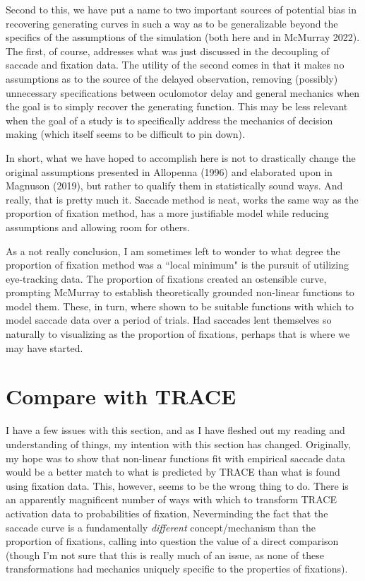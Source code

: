 \documentclass{article}
\begin{document}
Second to this, we have put a name to two important sources of potential bias in recovering generating curves in such a way as to be generalizable beyond the specifics of the assumptions of the simulation (both here and in McMurray 2022). The first, of course, addresses what was just discussed in the decoupling of saccade and fixation data. The utility of the second comes in that it makes no assumptions as to the source of the delayed observation, removing (possibly) unnecessary specifications between oculomotor delay and general mechanics when the goal is to simply recover the generating function. This may be less relevant when the goal of a study is to specifically address the mechanics of decision making (which itself seems to be difficult to pin down).

In short, what we have hoped to accomplish here is not to drastically change the original assumptions presented in Allopenna (1996) and elaborated upon in Magnuson (2019), but rather to qualify them in statistically sound ways. And really, that is pretty much it. Saccade method is neat, works the same way as the proportion of fixation method, has a more justifiable model while reducing assumptions and allowing room for others.

As a not really conclusion, I am sometimes left to wonder to what degree the proportion of fixation method was a  ``local minimum" is the pursuit of utilizing eye-tracking data. The proportion of fixations created an ostensible curve, prompting McMurray to establish theoretically grounded non-linear functions to model them. These, in turn, where shown to be suitable functions with which to model saccade data over a period of trials. Had saccades lent themselves so naturally to visualizing as the proportion of fixations, perhaps that is where we may have started.



\section{Compare with TRACE}

I have a few issues with this section, and as I have fleshed out my reading and understanding of things, my intention with this section has changed. Originally, my hope was to show that non-linear functions fit with empirical saccade data would be a better match to what is predicted by TRACE than what is found using fixation data. This, however, seems to be the wrong thing to do. There is an apparently magnificent number of ways with which to transform TRACE activation data to probabilities of fixation, Neverminding the fact that the saccade curve is a fundamentally \textit{different} concept/mechanism than the proportion of fixations, calling into question the value of a direct comparison (though I'm not sure that this is really much of an issue, as none of these transformations had mechanics uniquely specific to the properties of fixations).
\end{document}
